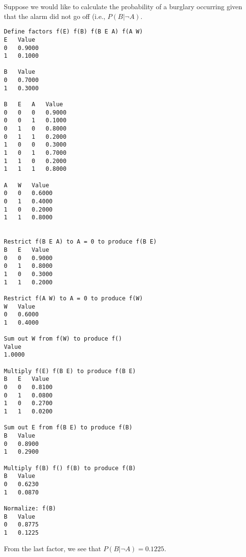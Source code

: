 \documentclass[12pt]{article}
\begin{document}
\begin{appendices}
\begin{center}
\end{center}

Suppose we would like to calculate the probability of a burglary occurring given that the alarm did not go off (i.e., $P(B|\lnot A)$.

\begin{verbatim}
Define factors f(E) f(B) f(B E A) f(A W)
E	Value
0	0.9000
1	0.1000

B	Value
0	0.7000
1	0.3000

B	E	A	Value
0	0	0	0.9000
0	0	1	0.1000
0	1	0	0.8000
0	1	1	0.2000
1	0	0	0.3000
1	0	1	0.7000
1	1	0	0.2000
1	1	1	0.8000

A	W	Value
0	0	0.6000
0	1	0.4000
1	0	0.2000
1	1	0.8000


Restrict f(B E A) to A = 0 to produce f(B E)
B	E	Value
0	0	0.9000
0	1	0.8000
1	0	0.3000
1	1	0.2000

Restrict f(A W) to A = 0 to produce f(W)
W	Value
0	0.6000
1	0.4000

Sum out W from f(W) to produce f()
Value
1.0000

Multiply f(E) f(B E) to produce f(B E)
B	E	Value
0	0	0.8100
0	1	0.0800
1	0	0.2700
1	1	0.0200

Sum out E from f(B E) to produce f(B)
B	Value
0	0.8900
1	0.2900

Multiply f(B) f() f(B) to produce f(B)
B	Value
0	0.6230
1	0.0870

Normalize: f(B)
B	Value
0	0.8775
1	0.1225
\end{verbatim}

From the last factor, we see that $P(B|\lnot A)=0.1225$.

\end{appendices}
\end{document}
